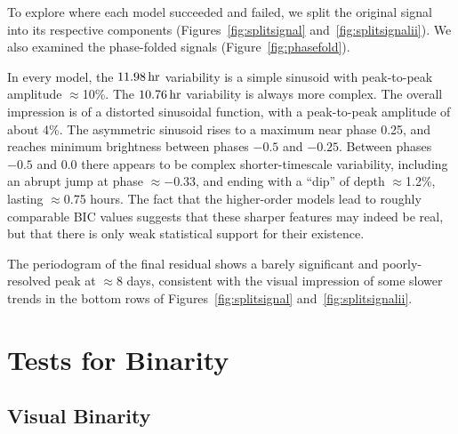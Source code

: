 \documentclass[12pt,twocolumn,tighten]{aastex62}
\begin{document}
To explore where each model succeeded and failed, we split the
original signal into its respective components
(Figures~\ref{fig:splitsignal} and~\ref{fig:splitsignalii}).  We also
examined the phase-folded signals (Figure~\ref{fig:phasefold}).  

In every model, the $11.98\,{\rm hr}$ variability is a simple sinusoid
with peak-to-peak amplitude $\approx$10\%.  The $10.76\,{\rm hr}$
variability is always more complex.  The overall impression is of a
distorted sinusoidal function, with a peak-to-peak amplitude of about
4\%.  The asymmetric sinusoid rises to a maximum near phase 0.25, and
reaches minimum brightness between phases $-0.5$ and $-0.25$.  Between
phases $-0.5$ and $0.0$ there appears to be complex shorter-timescale
variability, including an abrupt jump at phase $\approx -0.33$, and
ending with a ``dip'' of depth $\approx$1.2\%, lasting $\approx$0.75
hours.  The fact that the higher-order models lead to roughly
comparable BIC values suggests that these sharper features may indeed
be real, but that there is only weak statistical support for their
existence.

The periodogram of the final residual shows a barely significant and
poorly-resolved peak at $\approx$8 days, consistent with the visual
impression of some slower trends in the bottom rows of
Figures~\ref{fig:splitsignal} and~\ref{fig:splitsignalii}.

\section{Tests for Binarity}
\label{sec:gaia}

\subsection{Visual Binarity}
\label{subsec:blend}
\end{document}
